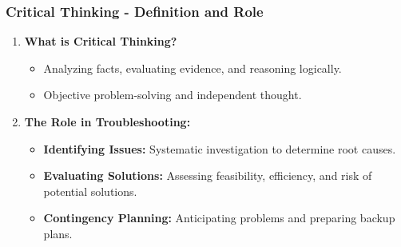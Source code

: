 \documentclass[aspectratio=169]{beamer}
\begin{document}
\begin{frame}[fragile]
    \frametitle{Critical Thinking - Definition and Role}
    \begin{enumerate}
        \item \textbf{What is Critical Thinking?}
            \begin{itemize}
                \item Analyzing facts, evaluating evidence, and reasoning logically.
                \item Objective problem-solving and independent thought.
            \end{itemize}
        
        \item \textbf{The Role in Troubleshooting:}
            \begin{itemize}
                \item \textbf{Identifying Issues:} Systematic investigation to determine root causes.
                \item \textbf{Evaluating Solutions:} Assessing feasibility, efficiency, and risk of potential solutions.
                \item \textbf{Contingency Planning:} Anticipating problems and preparing backup plans.
            \end{itemize}
    \end{enumerate}
\end{frame}
\end{document}
